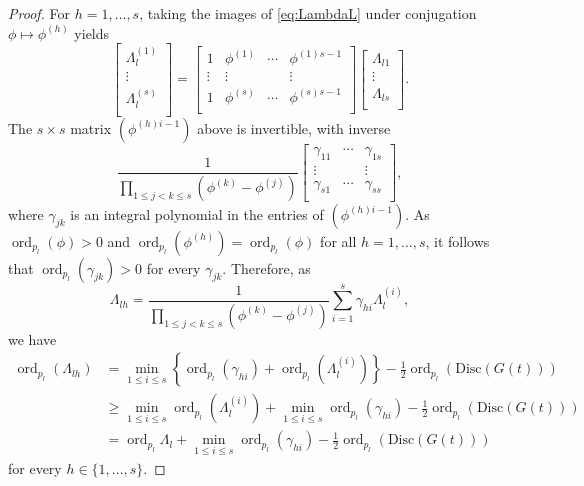 \documentclass[11pt]{report}
\theoremstyle{definition}
\DeclareMathOperator{\ord}{ord}
\begin{document}
\begin{proof}
For $h = 1, \dots, s$, taking the images of \eqref{eq:LambdaL} under conjugation $\phi \mapsto \phi^{(h)}$ yields
\[\begin{bmatrix}
\Lambda_l^{(1)} \\
\vdots \\
\Lambda_l^{(s)}	\\
\end{bmatrix}
=
\begin{bmatrix}
1 		& \phi^{(1)} 	& \cdots 	& \phi^{(1)s-1}\\
\vdots 	& \vdots 		& 		& \vdots \\
1 		& \phi^{(s)} 	& \cdots  	& \phi^{(s)s-1}\\
\end{bmatrix}
\begin{bmatrix}
\Lambda_{l1}\\
\vdots \\
\Lambda_{ls}\\
\end{bmatrix}.\]
The $s \times s$ matrix $(\phi^{(h)i-1})$ above is invertible, with inverse
\[\frac{1}{\displaystyle \prod_{1\leq j<k\leq s} (\phi^{(k)} - \phi^{(j)})}
\begin{bmatrix}
\gamma_{11} 	& \cdots 	& \gamma_{1s}\\
\vdots 		& 		& \vdots\\
\gamma_{s1} 	& \cdots 	& \gamma_{ss}\\
\end{bmatrix},\]
where $\gamma_{jk}$ is an integral polynomial in the entries of $(\phi^{(h)i-1})$. As $\ord_{p_l}(\phi) > 0$ and $\ord_{p_l}(\phi^{(h)}) = \ord_{p_l}(\phi)$ for all $h = 1, \dots, s$, it follows that $\ord_{p_l}(\gamma_{jk}) > 0 $ for every $\gamma_{jk}$. Therefore, as
\[\Lambda_{lh} = \frac{1}{\displaystyle \prod_{1\leq j<k\leq s}(\phi^{(k)} - \phi^{(j)})}\sum_{i = 1}^s \gamma_{hi}\Lambda_l^{(i)},\]
we have
\begin{align*}
\ord_{p_l}(\Lambda_{lh})
	& = \min_{1 \leq i \leq s} \left\{\ord_{p_l}(\gamma_{hi}) + \ord_{p_l}(\Lambda_l^{(i)})\right\} -\frac{1}{2}\ord_{p_l}(\text{Disc}(G(t)))\\
	& \geq \min_{1 \leq i \leq s} \ord_{p_l}(\Lambda_l^{(i)}) +  \min_{1 \leq i \leq s} \ord_{p_l}(\gamma_{hi}) - \frac{1}{2}\ord_{p_l}(\text{Disc}(G(t)))\\
	& = \ord_{p_l}\Lambda_l + \min_{1 \leq i \leq s} \ord_{p_l}(\gamma_{hi}) - \frac{1}{2}\ord_{p_l}(\text{Disc}(G(t)))
\end{align*}
for every $h \in \{1, \dots, s\}$.
\end{proof}
\end{document}
